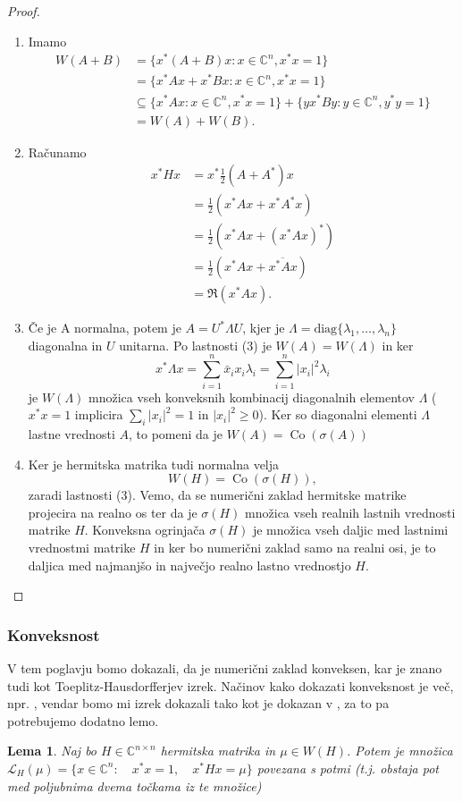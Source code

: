 \documentclass[12pt,a4paper]{amsart}
\theoremstyle{definition}
\theoremstyle{plain}
\newtheorem{lema}[definicija]{Lema}
\newcommand{\Co}{\operatorname{Co}} %
\newcommand{\LH}{\mathcal{L}}
\newcommand{\C}{\mathbb C}
\begin{document}
\begin{proof}
\begin{enumerate}[1.]
\item Imamo
\begin{align*}
W(A+B)&=\{x^\ast(A+B)x: x\in \C^n, x^\ast x=1\}\\
& = \{x^\ast Ax +x^\ast Bx: x\in \C^n, x^\ast x=1\}\\
& \subseteq \{x^\ast Ax: x\in \C^n, x^\ast x=1\}+\{yx^\ast By: y\in \C^n, y^\ast y=1\}\\
& =W(A) + W(B).
\end{align*}
\item Računamo
\begin{align*}
x^\ast Hx &= x^\ast \frac{1}{2}(A+A^\ast)x \\
 &=\frac{1}{2} (x^\ast Ax +x^\ast A^\ast x) \\
 &=\frac{1}{2}(x^\ast Ax +(x^\ast Ax)^\ast) \\
 &= \frac{1}{2}(x^\ast Ax +\overline{x^\ast Ax}) \\
 &= \Re (x^\ast Ax).
\end{align*}

\item Če je A normalna, potem je $A=U^\ast \Lambda U$, kjer je $\Lambda = \text{diag}\{\lambda_1, \dots, \lambda_n\}$ diagonalna in $U$ unitarna. 
Po lastnosti (3) je $W(A)=W(\Lambda)$ in ker $$x^\ast \Lambda x = \sum_{i=1}^{n} \bar{x}_i x_i\lambda_i = \sum_{i=1}^{n} |x_i|^2 \lambda_i$$ 
je $W(\Lambda)$ množica vseh konveksnih kombinacij diagonalnih elementov $\Lambda$ ($x^\ast x=1$ implicira $ \sum_{i} |x_i|^2 =1$ in $|x_i|^2 \geq 0$). 
Ker so diagonalni elementi $\Lambda$ lastne vrednosti $A$, to pomeni da je $W(A) =\Co(\sigma(A))$

\item Ker je hermitska matrika tudi normalna velja $$W(H) = \Co(\sigma(H)),$$ zaradi lastnosti (3). 
Vemo, da se numerični zaklad hermitske matrike projecira na realno os ter da je $\sigma(H)$ množica vseh realnih lastnih vrednosti matrike $H$. 
Konveksna ogrinjača $\sigma(H)$ je množica vseh daljic med lastnimi vrednostmi matrike $H$ in ker bo numerični zaklad samo na realni osi, je to daljica med najmanjšo in največjo realno lastno vrednostjo $H$.
\end{enumerate}
\end{proof}
\subsubsection{Konveksnost}
V tem poglavju bomo dokazali, da je numerični zaklad konveksen, kar je znano tudi kot Toeplitz-Hausdorfferjev izrek. 
Načinov kako dokazati konveksnost je več, npr. \cite{num}, vendar bomo mi izrek dokazali tako kot je dokazan v \cite{zaloga}, za to pa potrebujemo dodatno lemo. 
\begin{lema}
Naj bo $H\in \C^{n\times n}$ hermitska matrika in $\mu \in W(H)$. Potem je množica $\LH _{H}(\mu)=\{x\in \C^n:\quad x^\ast x=1,\quad x^\ast Hx=\mu\}$ povezana s potmi (t.j. obstaja pot med poljubnima dvema točkama iz te množice)%
\end{lema}
\end{document}
